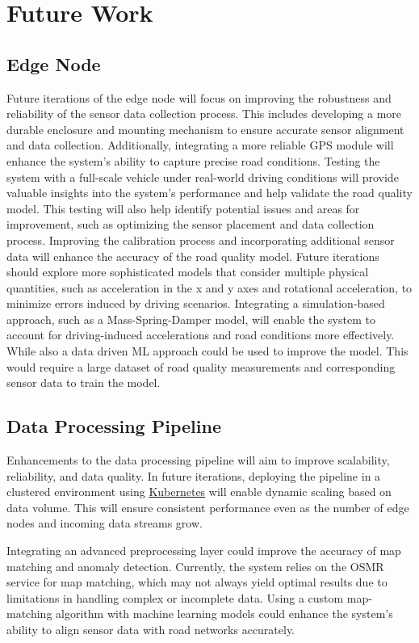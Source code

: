 \section{Future Work}

\subsection{Edge Node}

Future iterations of the edge node will focus on improving the robustness and reliability of the sensor data collection process. This includes developing a more durable enclosure and mounting mechanism to ensure accurate sensor alignment and data collection. Additionally, integrating a more reliable GPS module will enhance the system's ability to capture precise road conditions.
Testing the system with a full-scale vehicle under real-world driving conditions will provide valuable insights into the system's performance and help validate the road quality model. This testing will also help identify potential issues and areas for improvement, such as optimizing the sensor placement and data collection process.
Improving the calibration process and incorporating additional sensor data will enhance the accuracy of the road quality model. Future iterations should explore more sophisticated models that consider multiple physical quantities, such as acceleration in the x and y axes and rotational acceleration, to minimize errors induced by driving scenarios. Integrating a simulation-based approach, such as a Mass-Spring-Damper model, will enable the system to account for driving-induced accelerations and road conditions more effectively.
While also a data driven ML approach could be used to improve the model. This would require a large dataset of road quality measurements and corresponding sensor data to train the model.
\subsection{Data Processing Pipeline}

Enhancements to the data processing pipeline will aim to improve scalability, reliability, and data quality. In future iterations, deploying the pipeline in a clustered environment using \href{https://kubernetes.io/}{Kubernetes} will enable dynamic scaling based on data volume. This will ensure consistent performance even as the number of edge nodes and incoming data streams grow.

Integrating an advanced preprocessing layer could improve the accuracy of map matching and anomaly detection. Currently, the system relies on the OSMR service for map matching, which may not always yield optimal results due to limitations in handling complex or incomplete data. Using a custom map-matching algorithm with machine learning models could enhance the system's ability to align sensor data with road networks accurately.

